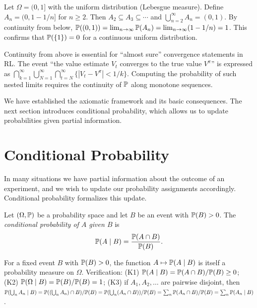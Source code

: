\documentclass[11pt,a4paper]{article}
\begin{document}
\begin{example}
\label{ex:continuity_below}
Let $\Omega = (0, 1]$ with the uniform distribution (Lebesgue measure).
Define $A_n = (0, 1 - 1/n]$ for $n \geq 2$. Then $A_2 \subseteq A_3
\subseteq \cdots$ and $\bigcup_{n=2}^\infty A_n = (0, 1)$. By continuity
from below,
$\mathbb{P}((0, 1)) = \lim_{n \to \infty} \mathbb{P}(A_n) = \lim_{n \to \infty}
(1 - 1/n) = 1$.
This confirms that $\mathbb{P}(\{1\}) = 0$ for a continuous uniform
distribution.
\end{example}

\begin{rlconnection}[title={Continuity and Convergence in RL}]
Continuity from above is essential for ``almost sure'' convergence
statements in RL. The event ``the value estimate $V_t$ converges to the
true value $V^\pi$'' is expressed as
$\bigcap_{k=1}^\infty \bigcup_{N=1}^\infty
\bigcap_{t=N}^\infty \{|V_t - V^\pi| < 1/k\}$. Computing the
probability of such nested limits requires the continuity of $\mathbb{P}$
along monotone sequences.
\end{rlconnection}

We have established the axiomatic framework and its basic consequences.
The next section introduces conditional probability, which allows us to
update probabilities given partial information.


\section{Conditional Probability}
\label{sec:cond_prob}

In many situations we have partial information about the outcome of an
experiment, and we wish to update our probability assignments accordingly.
Conditional probability formalizes this update.

\begin{definition}
\label{def:cond_prob}
Let $(\Omega, \mathbb{P})$ be a probability space and let $B$ be an event with
$\mathbb{P}(B) > 0$. The \emph{conditional probability of $A$ given $B$} is
\[
    \mathbb{P}(A \mid B) = \frac{\mathbb{P}(A \cap B)}{\mathbb{P}(B)}.
\]
\end{definition}

\begin{remark}
\label{rem:cond_is_prob}
For a fixed event $B$ with $\mathbb{P}(B) > 0$, the function
$A \mapsto \mathbb{P}(A \mid B)$ is itself a probability measure on $\Omega$.
Verification: (K1) $\mathbb{P}(A \mid B) = \mathbb{P}(A \cap B)/\mathbb{P}(B) \geq 0$;
(K2) $\mathbb{P}(\Omega \mid B) = \mathbb{P}(B)/\mathbb{P}(B) = 1$; (K3) if
$A_1, A_2, \ldots$ are pairwise disjoint, then
$\mathbb{P}(\bigcup_n A_n \mid B)
= \mathbb{P}((\bigcup_n A_n) \cap B)/\mathbb{P}(B)
= \mathbb{P}(\bigcup_n (A_n \cap B))/\mathbb{P}(B)
= \sum_n \mathbb{P}(A_n \cap B)/\mathbb{P}(B)
= \sum_n \mathbb{P}(A_n \mid B)$.
\end{remark}
\end{document}
